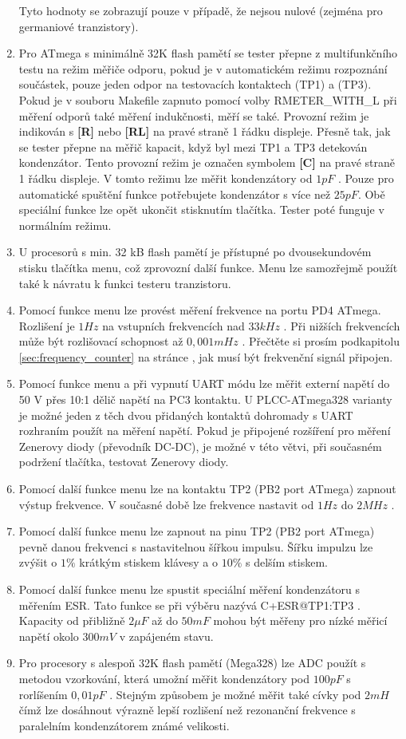 \begin{enumerate}
Tyto hodnoty se zobrazují pouze v případě, že nejsou nulové (zejména pro germaniové tranzistory).
\item Pro ATmega s minimálně 32K flash pamětí se tester přepne z multifunkčního testu na režim
měřiče odporu, pokud je v automatickém režimu rozpoznání součástek, pouze jeden odpor na testovacích kontaktech (TP1) a (TP3). Pokud je v souboru Makefile zapnuto pomocí volby RMETER\_WITH\_L při měření odporů také měření indukčnosti, měří se také. Provozní režim je indikován s {\bf[R]} nebo {\bf[RL]} na pravé straně 1 řádku displeje. Přesně tak, jak se tester přepne na měřič kapacit, když byl mezi TP1 a TP3 detekován kondenzátor.
Tento provozní režim je označen symbolem {\bf[C]} na pravé straně 1 řádku displeje.
V tomto režimu lze měřit kondenzátory  od \(1pF\) . Pouze pro automatické spuštění funkce
potřebujete kondenzátor s více než \(25pF\).
Obě speciální funkce lze opět ukončit stisknutím tlačítka. Tester poté funguje v normálním režimu.
\item U procesorů s min. 32 kB flash pamětí je přístupné po dvousekundovém stisku tlačítka menu, což zprovozní další funkce. Menu lze samozřejmě použít také k návratu k funkci testeru tranzistoru.
\item Pomocí funkce menu lze provést měření frekvence na portu PD4 ATmega.
Rozlišení je  \(1Hz\) na vstupních frekvencích nad \(33kHz\) .
Při nižších frekvencích může být rozlišovací schopnost až \(0,001mHz\) .
Přečtěte si prosím podkapitolu \ref{sec:frequency_counter} na stránce \pageref{sec:frequency_counter},
jak musí být frekvenční signál připojen.
\item Pomocí funkce menu a při vypnutí UART módu lze měřit externí napětí do 50 V přes 10:1 dělič napětí na PC3 kontaktu. U PLCC-ATmega328 varianty je možné jeden z těch dvou přidaných kontaktů dohromady s UART rozhraním použít na měření napětí. Pokud je připojené rozšíření pro měření Zenerovy diody (převodník DC-DC), je možné v této větvi, při současném podržení tlačítka, testovat Zenerovy diody.
\item Pomocí další funkce menu lze na kontaktu TP2 (PB2 port ATmega) zapnout výstup frekvence.
V současné době lze frekvence nastavit od \(1Hz\) do \(2MHz\) .
\item Pomocí další funkce menu lze zapnout na pinu TP2 (PB2 port ATmega) pevně danou frekvenci s nastavitelnou šířkou impulsu.
Šířku impulzu lze zvýšit o \(1\%\) krátkým stiskem klávesy a o \(10\%\) s delším stiskem.
\item Pomocí další funkce menu lze spustit speciální měření kondenzátoru s měřením ESR.
Tato funkce se při výběru nazývá \mbox{C+ESR@TP1:TP3} .
 Kapacity od přibližně \(2\mu F\) až do \(50mF\) mohou být měřeny pro nízké měřicí napětí okolo \(300mV\)
 v zapájeném stavu.
\item Pro procesory s alespoň 32K flash pamětí (Mega328) lze ADC použít s metodou vzorkování,
která umožní měřit kondenzátory pod \(100pF\) s rorlíšením  \(0,01pF\) .
Stejným způsobem je možné měřit také cívky pod \(2mH\) čímž lze dosáhnout výrazně lepší rozlišení
než rezonanční frekvence s paralelním kondenzátorem známé velikosti.
\end{enumerate}

